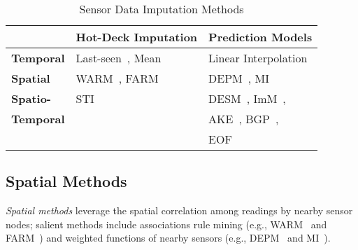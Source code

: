 
\begin{table}
\caption{Sensor Data Imputation Methods}
\label{tbl:methods}
\centering
{\small
\begin{tabular}{|l|l|l|} \hline
   &{\bf Hot-Deck Imputation}&{\bf Prediction Models}\\ \hline
{\bf Temporal} & Last-seen~\cite{Granger:lastseen}, Mean & Linear Interpolation\\ \hline
{\bf Spatial} & WARM~\cite{le2005estimating}, FARM~\cite{Gruenwald:FARM} & DEPM~\cite{li2008data}, MI~\cite{yuan2000multiple}\\\hline
{\bf Spatio-} & STI~\cite{Jian-Zhong:STI} & DESM~\cite{li2008data}, ImM~\cite{Lim:robust},\\
{\bf Temporal} && AKE~\cite{pan2010k}, BGP~\cite{osborne2012real},\\
               && EOF~\cite{beckers2003eof, kondrashov2006spatio}\\
 \hline \end{tabular}
}
\vspace{-0.1in}
\end{table}

\subsection{Spatial Methods}\label{subsec:sm}
{\em Spatial methods} leverage the spatial correlation among readings
by nearby sensor nodes; salient methods include associations rule
mining (e.g., WARM~\cite{le2005estimating} and
FARM~\cite{Gruenwald:FARM}) 
and weighted functions of nearby sensors (e.g., DEPM~\cite{li2008data}
and MI~\cite{yuan2000multiple}).


